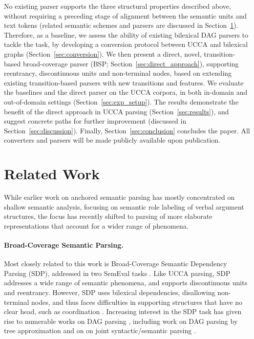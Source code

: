\documentclass[11pt]{article}
\newcommand{\secref}[1]{Section~\ref{#1}}
\begin{document}
No existing parser supports the three structural properties described above,
without requiring a preceding stage of alignment between the semantic units and text tokens
(related semantic schemes and parsers are discussed in \secref{sec:related_work}).
Therefore, as a baseline,
we assess the ability of existing bilexical DAG parsers to tackle the task,
by developing a conversion protocol between UCCA and bilexical graphs
(\secref{sec:conversion}).
We then present a direct, novel, transition-based broad-coverage parser
(BSP; \secref{sec:direct_approach}),
supporting reentrancy, discontinuous units and non-terminal nodes,
based on extending existing transition-based parsers
with new transitions and features.
We evaluate the baselines and the direct parser on the UCCA corpora, in both
in-domain and out-of-domain settings (\secref{sec:exp_setup}).
The results demonstrate the benefit of the direct approach in UCCA parsing (\secref{sec:results}),
and suggest concrete paths for further improvement (discussed in \secref{sec:discussion}).
Finally, \secref{sec:conclusion} concludes the paper.
All converters and parsers will be made publicly available upon publication.



\section{Related Work}\label{sec:related_work}
While earlier work on anchored semantic parsing has mostly concentrated on shallow semantic analysis,
focusing on semantic role labeling of verbal argument structures,
the focus has recently shifted to parsing of more elaborate representations that account
for a wider range of phenomena.

\paragraph{Broad-Coverage Semantic Parsing.}
Most closely related to this work is Broad-Coverage Semantic Dependency Parsing (SDP),
addressed in two SemEval tasks \cite{oepen2014semeval,oepen2015semeval}.
Like UCCA parsing, SDP addresses a wide range of semantic phenomena,
and supports discontinuous units and reentrancy. However, SDP uses
bilexical dependencies, disallowing non-terminal nodes, and thus faces difficulties in supporting
structures that have no clear head, such as coordination
\cite[see \secref{sec:introduction}]{Ivanova2012who}.
Increasing interest in the SDP task has given rise to numerable works on DAG parsing
\cite{ribeyre-villemontedelaclergerie-seddah:2014:SemEval,thomson-EtAl:2014:SemEval,almeida-martins:2015:SemEval,du-EtAl:2015:SemEval}, including work on DAG parsing by tree approximation
\cite{agic-koller:2014:SemEval,schluter-EtAl:2014:SemEval}
and on on joint syntactic/semantic parsing
\cite{henderson2013multilingual,swayamdipta-EtAl:2016:CoNLL}.
\end{document}
